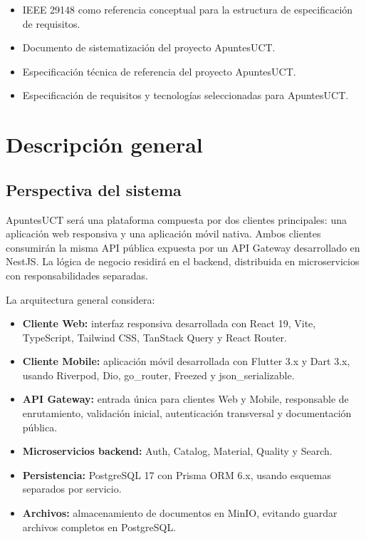 \documentclass[12pt,a4paper]{article}
\begin{document}
\begin{itemize}
    \item IEEE 29148 como referencia conceptual para la estructura de especificación de requisitos.
    \item Documento de sistematización del proyecto ApuntesUCT.
    \item Especificación técnica de referencia del proyecto ApuntesUCT.
    \item Especificación de requisitos y tecnologías seleccionadas para ApuntesUCT.
\end{itemize}

\section{Descripción general}

\subsection{Perspectiva del sistema}

ApuntesUCT será una plataforma compuesta por dos clientes principales: una aplicación web responsiva y una aplicación móvil nativa. Ambos clientes consumirán la misma API pública expuesta por un API Gateway desarrollado en NestJS. La lógica de negocio residirá en el backend, distribuida en microservicios con responsabilidades separadas.

La arquitectura general considera:

\begin{itemize}
    \item \textbf{Cliente Web:} interfaz responsiva desarrollada con React 19, Vite, TypeScript, Tailwind CSS, TanStack Query y React Router.
    \item \textbf{Cliente Mobile:} aplicación móvil desarrollada con Flutter 3.x y Dart 3.x, usando Riverpod, Dio, go\_router, Freezed y json\_serializable.
    \item \textbf{API Gateway:} entrada única para clientes Web y Mobile, responsable de enrutamiento, validación inicial, autenticación transversal y documentación pública.
    \item \textbf{Microservicios backend:} Auth, Catalog, Material, Quality y Search.
    \item \textbf{Persistencia:} PostgreSQL 17 con Prisma ORM 6.x, usando esquemas separados por servicio.
    \item \textbf{Archivos:} almacenamiento de documentos en MinIO, evitando guardar archivos completos en PostgreSQL.
\end{itemize}
\end{document}
